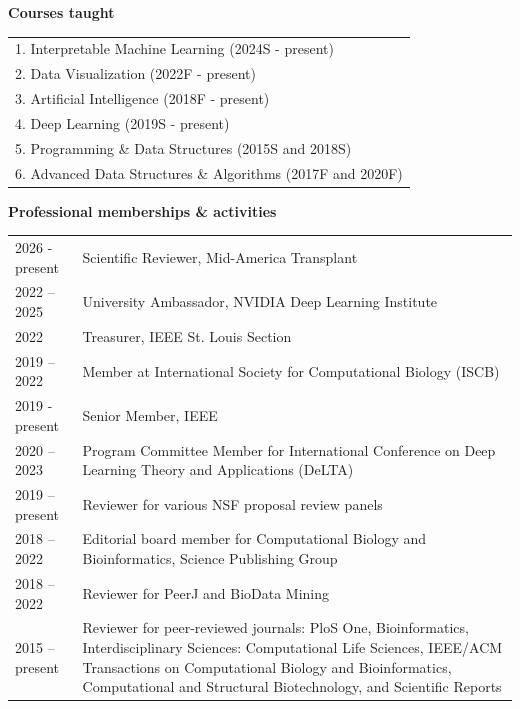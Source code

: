 \documentclass[11pt]{article}
\begin{document}
\vspace{0.5cm}

\newpage

\textbf{Courses taught}

\vspace{0.5cm}

\begin{tabular}{ l }
1. Interpretable Machine Learning (2024S - present)\\
2. Data Visualization (2022F - present)\\
3. Artificial Intelligence (2018F - present)\\
4. Deep Learning (2019S - present)\\
5. Programming \& Data Structures (2015S and 2018S)\\
6. Advanced Data Structures \& Algorithms (2017F and 2020F) \\
\end{tabular}

\vspace{0.5cm}

\textbf{Professional memberships \& activities}

\vspace{0.5cm}

\begin{tabular}{ l >{\raggedright\arraybackslash}p{13cm} }
2026 - present & Scientific Reviewer, Mid-America Transplant \\
2022 – 2025    & University Ambassador, NVIDIA Deep Learning Institute \\
2022           & Treasurer, IEEE St. Louis Section \\
2019 – 2022    & Member at International Society for Computational Biology (ISCB) \\
2019 - present & Senior Member, IEEE \\
2020 – 2023    & Program Committee Member for International Conference on Deep Learning Theory and Applications (DeLTA)  \\
2019 – present & Reviewer for various NSF proposal review panels \\
2018 – 2022    & Editorial board member for Computational Biology and Bioinformatics, Science Publishing Group \\
2018 – 2022    & Reviewer for PeerJ and BioData Mining \\
2015 – present & Reviewer for peer-reviewed journals: PloS One, Bioinformatics, Interdisciplinary Sciences: Computational Life Sciences, IEEE/ACM Transactions on Computational Biology and Bioinformatics, Computational and Structural Biotechnology, and Scientific Reports
\end{tabular}
\end{document}
